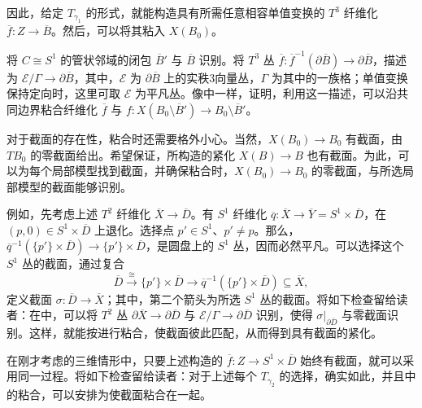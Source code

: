 因此，给定 $T_{\gamma_1}$ 的形式，就能构造具有所需任意相容单值变换的 $T^3$ 纤维化 $\overline f\colon Z\to\overline B$。然后，可以将其粘入 $X(B_0)$。

\begin{exercise}[粘合的细节]\label{exer:6.96}
将 $C\cong S^1$ 的管状邻域的闭包 $\overline B'$ 与 $\overline B$ 识别。将 $T^3$ 丛 $\overline f\colon\overline f^{-1}(\partial\overline B)\to\partial\overline B$，描述为 $\mathcal E/\Gamma\to\partial\overline B$，其中，$\mathcal E$ 为 $\partial\overline B$ 上的实秩3向量丛，$\Gamma$ 为其中的一族格；单值变换保持定向时，这里可取 $\mathcal E$ 为平凡丛。像中一样，证明，利用这一描述，可以沿共同边界粘合纤维化 $\overline f$ 与 $f\colon X(B_0\setminus\overline B')\to B_0\setminus\overline B'$。
\end{exercise}

\begin{note}[numbered]\label{note:6.97}
对于截面的存在性，粘合时还需要格外小心。当然，$X(B_0)\to B_0$ 有截面，由 $TB_0$ 的零截面给出。希望保证，所构造的紧化 $X(B)\to B$ 也有截面。为此，可以为每个局部模型找到截面，并确保粘合时，$X(B_0)\to B_0$ 的零截面，与所选局部模型的截面能够识别。

例如，先考虑上述 $T^2$ 纤维化 $\overline X\to\overline D$。有 $S^1$ 纤维化 $\overline q\colon\overline X\to\overline Y=S^1\times\overline D$，在 $(p,0)\in S^1\times\overline D$ 上退化。选择点 $p'\in S^1$、$p'\ne p$。那么，$\overline q^{-1}(\{p'\}\times\overline D)\to\{p'\}\times\overline D$，是圆盘上的 $S^1$ 丛，因而必然平凡。可以选择这个 $S^1$ 丛的截面，通过复合
\[
\overline D\xrightarrow{\ \cong\ }\{p'\}\times\overline D
\longrightarrow\overline q^{-1}(\{p'\}\times\overline D)\subseteq\overline X,
\]
定义截面 $\sigma\colon\overline D\to\overline X$；其中，第二个箭头为所选 $S^1$ 丛的截面。将如下检查留给读者：在中，可以将 $T^2$ 丛 $\partial\overline X\to\partial\overline D$ 与 $\mathcal E/\Gamma\to\partial\overline D$ 识别，使得 $\sigma|_{\partial\overline D}$ 与零截面识别。这样，就能按进行粘合，使截面彼此匹配，从而得到具有截面的紧化。

在刚才考虑的三维情形中，只要上述构造的 $\overline f\colon Z\to S^1\times\overline D$ 始终有截面，就可以采用同一过程。将如下检查留给读者：对于上述每个 $T_{\gamma_2}$ 的选择，确实如此，并且中的粘合，可以安排为使截面粘合在一起。
\end{note}


